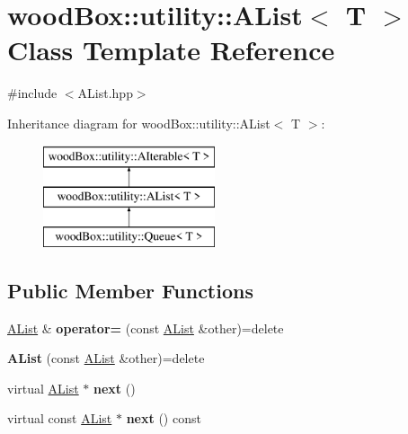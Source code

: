 \hypertarget{classwood_box_1_1utility_1_1_a_list}{}\section{wood\+Box\+:\+:utility\+:\+:A\+List$<$ T $>$ Class Template Reference}
\label{classwood_box_1_1utility_1_1_a_list}


{\ttfamily \#include $<$A\+List.\+hpp$>$}

Inheritance diagram for wood\+Box\+:\+:utility\+:\+:A\+List$<$ T $>$\+:\begin{figure}[H]
\begin{center}
\leavevmode
\includegraphics[height=3.000000cm]{classwood_box_1_1utility_1_1_a_list}
\end{center}
\end{figure}
\subsection*{Public Member Functions}
\begin{DoxyCompactItemize}
\item 
\mbox{\label{classwood_box_1_1utility_1_1_a_list_a30c716d7e6462759801d1d3009ed5d13}} 
\mbox{\hyperlink{classwood_box_1_1utility_1_1_a_list}{A\+List}} \& {\bfseries operator=} (const \mbox{\hyperlink{classwood_box_1_1utility_1_1_a_list}{A\+List}} \&other)=delete
\item 
\mbox{\label{classwood_box_1_1utility_1_1_a_list_ae899fa889dc8909ee9cdffb2cdb0d2b4}} 
{\bfseries A\+List} (const \mbox{\hyperlink{classwood_box_1_1utility_1_1_a_list}{A\+List}} \&other)=delete
\item 
\mbox{\label{classwood_box_1_1utility_1_1_a_list_ae3769cd3b298718c827026e8f17a2ece}} 
virtual \mbox{\hyperlink{classwood_box_1_1utility_1_1_a_list}{A\+List}} $\ast$ {\bfseries next} ()
\item 
\mbox{\label{classwood_box_1_1utility_1_1_a_list_a39e93ebf127847d1f8e7d99c8aa90c2e}} 
virtual const \mbox{\hyperlink{classwood_box_1_1utility_1_1_a_list}{A\+List}} $\ast$ {\bfseries next} () const
\end{DoxyCompactItemize}
